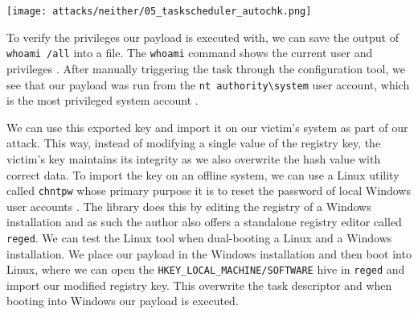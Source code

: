 \texttt{[image: attacks/neither/05\_taskscheduler\_autochk.png]}

To verify the privileges our payload is executed with, we can save the output of \lstinline{whoami /all} into a file.
The \lstinline{whoami} command shows the current user and privileges \cite{microsoft-whoami}.
After manually triggering the task through the configuration tool, we see that our payload was run from the \lstinline{nt authority\system} user account, which is the most privileged system account \cite{microsoft-localsystem-account}.


We can use this exported key and import it on our victim's system as part of our attack.
This way, instead of modifying a single value of the registry key, the victim's key maintains its integrity as we also overwrite the hash value with correct data.
To import the key on an offline system, we can use a Linux utility called \lstinline{chntpw} whose primary purpose it is to reset the password of local Windows user accounts \cite{chntpw}.
The library does this by editing the registry of a Windows installation and as such the author also offers a standalone registry editor called \lstinline{reged}.
We can test the Linux tool when dual-booting a Linux and a Windows installation.
We place our payload in the Windows installation and then boot into Linux, where we can open the \lstinline{HKEY_LOCAL_MACHINE/SOFTWARE} hive in \lstinline{reged} and import our modified registry key.
This overwrite the task descriptor and when booting into Windows our payload is executed.

